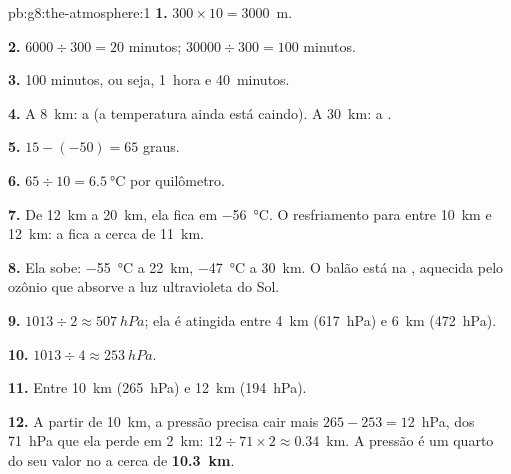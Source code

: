 \begin{solution}{pb:g8:the-atmosphere:1}
\textbf{1.} $300 \times 10 = 3000$~m.

\textbf{2.} $6000 \div 300 = 20$ minutos; $\num{30000} \div 300 = 100$
minutos.

\textbf{3.} 100 minutos, ou seja, 1~hora e 40~minutos.

\textbf{4.} A \qty{8}{km}: a  (a temperatura ainda está
caindo). A \qty{30}{km}: a .

\textbf{5.} $15 - (-50) = 65$ graus.

\textbf{6.} $65 \div 10 = \qty{6.5}{\degreeCelsius}$ por quilômetro.

\textbf{7.} De \qty{12}{km} a \qty{20}{km}, ela fica em
\qty{-56}{\degreeCelsius}. O resfriamento para entre \qty{10}{km} e
\qty{12}{km}: a  fica a cerca de \qty{11}{km}.

\textbf{8.} Ela sobe: \qty{-55}{\degreeCelsius} a \qty{22}{km},
\qty{-47}{\degreeCelsius} a \qty{30}{km}. O balão está na ,
aquecida pelo ozônio que absorve a luz ultravioleta do Sol.

\textbf{9.} $1013 \div 2 \approx \qty{507}{hPa}$; ela é atingida entre
\qty{4}{km} (\qty{617}{hPa}) e \qty{6}{km} (\qty{472}{hPa}).

\textbf{10.} $1013 \div 4 \approx \qty{253}{hPa}$.

\textbf{11.} Entre \qty{10}{km} (\qty{265}{hPa}) e \qty{12}{km}
(\qty{194}{hPa}).

\textbf{12.} A partir de \qty{10}{km}, a pressão precisa cair mais $265 - 253 =
12$~hPa, dos 71~hPa que ela perde em 2~km: $12 \div 71 \times 2
\approx 0.34$~km. A pressão é um quarto do seu valor no  a
cerca de \textbf{\qty{10.3}{km}}.
\end{solution}
